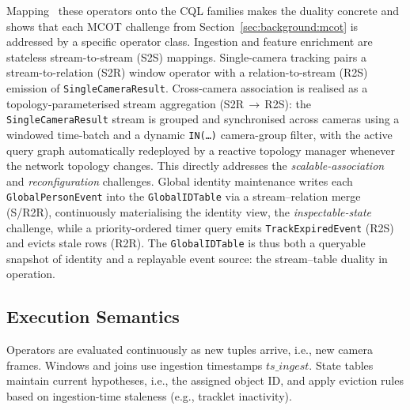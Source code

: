 \documentclass[review]{elsarticle}
\begin{document}
Mapping%
~these operators onto the CQL families makes the duality concrete and shows that each MCOT challenge from Section~\ref{sec:background:mcot} is addressed by a specific operator class. Ingestion and feature enrichment are stateless stream-to-stream (S2S) mappings. Single-camera tracking pairs a stream-to-relation (S2R) window operator with a relation-to-stream (R2S) emission of \texttt{SingleCameraResult}. Cross-camera association is realised as a topology-parameterised stream aggregation (S2R\,$\to$\,R2S): the \texttt{SingleCameraResult} stream is grouped and synchronised across cameras using a windowed time-batch and a dynamic \texttt{IN(\dots)} camera-group filter, with the active query graph automatically redeployed by a reactive topology manager whenever the network topology changes. This directly addresses the \emph{scalable-association} and \emph{reconfiguration} challenges. Global identity maintenance writes each \texttt{GlobalPersonEvent} into the \texttt{GlobalIDTable} via a stream--relation merge
(S/R2R), continuously materialising the identity view, the \emph{inspectable-state} challenge, while a priority-ordered timer query emits \texttt{TrackExpiredEvent} (R2S) and evicts stale rows (R2R). The \texttt{GlobalIDTable} is thus both a queryable snapshot of identity and a replayable event
source: the stream--table duality in operation.

\subsection{Execution Semantics}
\label{sec:overview:execution}

Operators are evaluated continuously as new tuples arrive, i.e., new camera frames. Windows and joins use ingestion timestamps $\textit{ts\_ingest}$. State tables maintain current hypotheses, i.e., the assigned object ID, and apply eviction rules based on ingestion-time staleness (e.g., tracklet inactivity).

\end{document}
